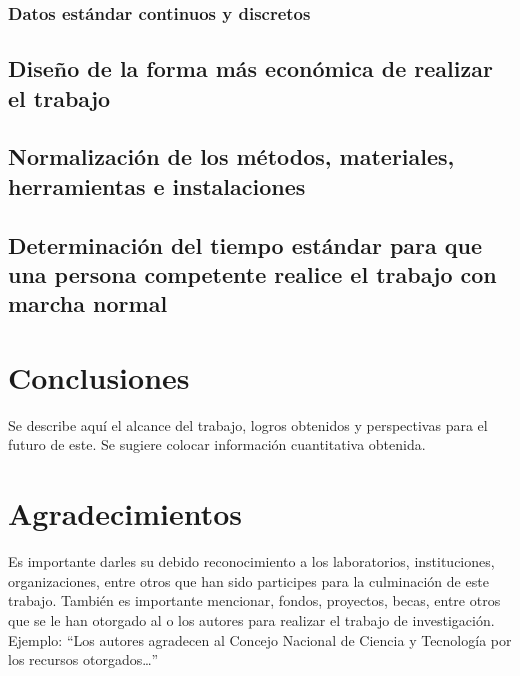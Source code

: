     \subsubsection{Datos estándar continuos y discretos}
    \subsection{Diseño de la forma más económica de realizar el trabajo}
    
    \subsection{Normalización de los métodos, materiales, herramientas e instalaciones}
    
    \subsection{Determinación del tiempo estándar para que una persona competente realice el trabajo con marcha normal}
    
    
    \section{Conclusiones}
    
    Se describe aquí el alcance del trabajo, logros obtenidos y perspectivas para el futuro de este. Se sugiere colocar información cuantitativa obtenida.
    
    \section{Agradecimientos}
    
    Es importante darles su debido reconocimiento a los laboratorios, instituciones, organizaciones, entre otros que han sido participes para la culminación de este trabajo. También es importante mencionar, fondos, proyectos, becas, entre otros que se le han otorgado al o los autores para realizar el trabajo de investigación. Ejemplo: “Los autores agradecen al Concejo Nacional de Ciencia y Tecnología por los recursos otorgados…”
    
    
